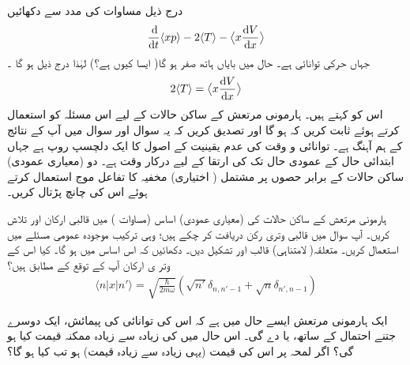 \quad
 درج ذیل  مساوات   کی مدد سے دکھائیں 
\begin{align}
\frac{\dif}{\dif t} \langle xp \rangle -2\langle T \rangle - \big\langle x \frac{\dif V}{\dif x} \big\rangle
\end{align}
جہاں  حرکی توانائی  ہے۔ حال میں بایاں ہاتھ صفر ہو گا( ایسا کیوں ہے؟) لہٰذا درج ذیل ہو گا ۔
\begin{align}
2\langle T \rangle = \big\langle x \frac{\dif V}{\dif x} \big\rangle
\end{align}
اس کو  کہتے ہیں۔ ہارمونی مرتعش کے ساکن حالات کے لیے اس مسئلہ کو استعمال کرتے ہوئے ثابت کریں کہ  ہو گا اور تصدیق کریں کہ یہ سوال اور سوال   میں آپ کے   نتائج کے ہم آہنگ ہے۔
توانائی  و  وقت کی عدم یقینیت کے اصول کا ایک دلچسپ روپ  ہے جہاں ابتدائی حال   کے عمودی حال تک  کی  ارتقا کے لیے درکار وقت  ہے۔ دو (معیاری عمودی) ساکن حالات کے   برابر حصوں پر مشتمل ( اختیاری)  مخفیہ  کا تفاعل موج     استعمال کرتے ہوئے اس کی چانچ    پڑتال کریں۔

ہارمونی مرتعش کے  ساکن  حالات کی (معیاری عمودی)  اساس  (مساوات ) میں قالبی ارکان     اور   تلاش کریں۔ آپ سوال  میں  قالبی وتری رکن   دریافت کر چکے ہیں؛  وہی ترکیب موجودہ عمومی مسئلے میں استعمال کریں۔  متعلقہ(  لامتناہی) قالب     اور   تشکیل دیں۔ دکھائیں کہ اس اساس میں
 ہو گا۔ کیا اس کے وتر ی ارکان آپ کے توقع کے مطابق ہیں؟
\begin{align}
\langle n|x|n'\rangle=\sqrt{\frac{\hslash}{2m\omega}}(\sqrt{n'}\delta_{n,n'-1}+\sqrt{n}\delta_{n',n-1})
\end{align}

ایک ہارمونی مرتعش ایسے حال میں ہے کہ اس کی توانائی کی  پیمائش،  ایک دوسرے جتنے  احتمال کے ساتھ،   یا  دے گی۔ اس حال میں    کی زیادہ سے زیادہ ممکنہ قیمت کیا  ہو گی؟  اگر لمحہ   پر اس کی     قیمت (یہی زیادہ سے زیادہ  قیمت)  ہو تب   کیا ہو گا؟

